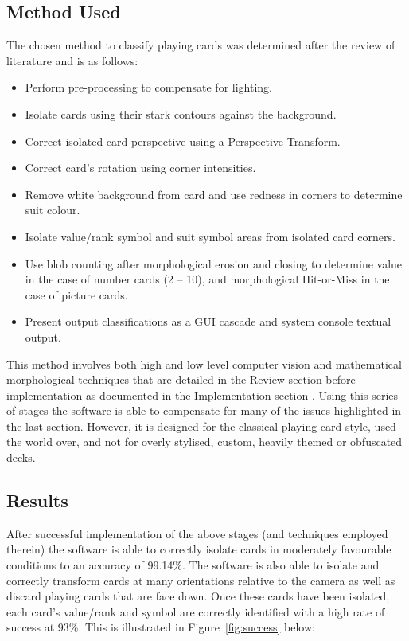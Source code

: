 	\subsection{Method Used}
		The chosen method to classify playing cards was determined after the review of literature and is as follows:
		\begin{itemize}
			\item Perform pre-processing to compensate for lighting.
			\item Isolate cards using their stark contours against the background.
			\item Correct isolated card perspective using a Perspective Transform.
			\item Correct card's rotation using corner intensities.
			\item Remove white background from card and use redness in corners to determine suit colour.
			\item Isolate value/rank symbol and suit symbol areas from isolated card corners.
			\item Use blob counting after morphological erosion and closing to determine value in the case of number cards (2 -- 10), and morphological Hit-or-Miss in the case of picture cards.
			\item Present output classifications as a GUI cascade and system console textual output.
		\end{itemize}

		This method involves both high and low level computer vision and mathematical morphological techniques that are detailed in the Review section  before implementation as documented in the Implementation section . Using this series of stages the software is able to compensate for many of the issues highlighted in the last section. However, it is designed for the classical playing card style, used the world over, and not for overly stylised, custom, heavily themed or obfuscated decks.
	\subsection{Results}
		After successful implementation of the above stages (and techniques employed therein) the software is able to correctly isolate cards in moderately favourable conditions to an accuracy of 99.14\%. The software is also able to isolate and correctly transform cards at many orientations relative to the camera as well as discard playing cards that are face down. Once these cards have been isolated, each card's value/rank and symbol are correctly identified with a high rate of success at 93\%. This is illustrated in Figure~\ref{fig:success} below:

